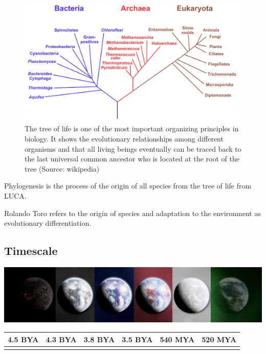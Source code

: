 \documentclass[
  11pt,
]{book}
\begin{document}
\begin{figure}

{\centering \includegraphics[width=1\linewidth]{./figs/Phylogenetic_tree} 

}

\caption{The tree of life is one of the most important organizing principles in biology. It shows the evolutionary relationships among different organisms and that all living beings eventually can be traced back to the last universal common ancestor who is located at the root of the tree (Source: wikipedia)}\label{fig:treeOfLifeBis}
\end{figure}

Phylogenesis is the process of the origin of all species from the tree of life from LUCA.

Rolando Toro refers to the origin of species and adaptation to the environment as evolutionary differentiation.

\hypertarget{timescale}{%
\subsection{Timescale}\label{timescale}}

\includegraphics{./figs/liferockystartstrip.jpeg}

\begin{longtable}[]{@{}llllll@{}}
\toprule()
4.5 BYA & 4.3 BYA & 3.8 BYA & 3.5 BYA & 540 MYA & 520 MYA \\
\midrule()
\endhead
& & & & & \\
\bottomrule()
\end{longtable}
\end{document}
